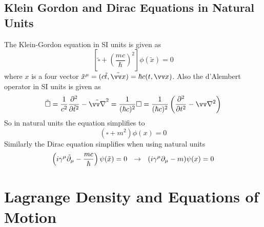 \subsection{Klein Gordon and Dirac Equations in Natural Units}
The Klein-Gordon equation in SI units is given as
\[
\left[ \tilde{\square} + \left( \frac{mc}{\hbar}\right)^2 \right] \phi(\tilde{x}) = 0
\]
where $x$ is a four vector $\tilde{x}^\mu = ( c \tilde{t}, \tilde{\vx}) = \hbar c (t , \vx)$. Also the d'Alembert operator in SI units is given as
\[ 
\tilde{\square} = \frac{1}{c^2} \frac{\p^2}{\p \tilde{t}^2} - \tilde{\vn}^2 = \frac{1}{(\hbar c)^2} \square = \frac{1}{(\hbar c)^2} \left( \frac{\p^2}{\p t^2} - \vn^2 \right)
\]
So in natural units the equation simplifies to 
\[ ( \square + m^2 ) \phi(x) = 0\]
\newline
Similarly the Dirac equation simplifies when using natural units
\[
\left( i \gamma^\mu \tilde{\partial}_\mu - \frac{m c}{\hbar}\right) \psi(\tilde{x}) = 0 ~~\rightarrow~~ (i \gamma^\mu \partial_\mu - m ) \psi(x) = 0
\]

\section{Lagrange Density and Equations of Motion}

